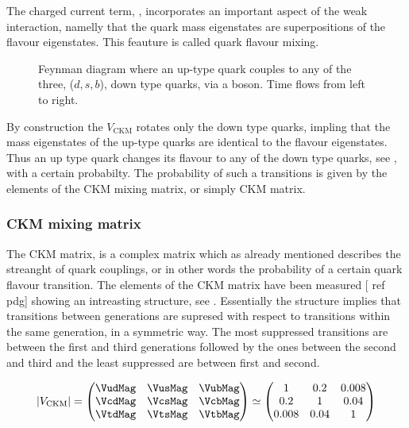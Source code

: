 The charged current term, , incorporates an important aspect of the weak interaction,
namelly that the quark mass eigenstates are superpositions of the flavour eigenstates. This feauture is called
quark flavour mixing.

\begin{figure}[h]
  \centering
  {\sffamily }
  \caption{Feynman diagram where an up-type quark couples to any of the three, ($d,s,b$), down type quarks,
           via a \Wp boson. Time flows from left to right.}
  \label{QuarkMixing}
\end{figure}

\noindent By construction the $V_{\text{CKM}}$ rotates only the down type quarks, impling that
the mass eigenstates of the up-type quarks are identical to the flavour eigenstates. Thus an up type quark
changes its flavour to any of the down type quarks, see , with a certain probabilty.
The probability of such a transitions is given by the elements of the CKM mixing matrix, or simply CKM matrix.

\subsubsection{CKM mixing matrix}
The CKM matrix, is a complex matrix which as already mentioned describes the streanght of quark couplings,
or in other words the probability of a certain quark flavour transition. The elements of the CKM matrix have been measured [{\color{red} ref pdg}]
showing an intreasting structure, see . Essentially the structure implies that transitions between generations
are supresed with respect to transitions within the same generation, in a symmetric way. The most suppressed transitions are between
the first and third generations followed by the ones between the second and third and the least suppressed are between first and second.

\begin{equation}
  |V_{\text{CKM}}|
                   = \begin{pmatrix} \VudMag & \VusMag & \VubMag \\ \VcdMag & \VcsMag & \VcbMag \\ \VtdMag & \VtsMag & \VtbMag \end{pmatrix}
              \simeq \begin{pmatrix} 1 & 0.2 & 0.008 \\ 0.2 & 1 & 0.04 \\ 0.008 & 0.04 & 1 \end{pmatrix}
      \label{CKMmatrix}
  \end{equation}

